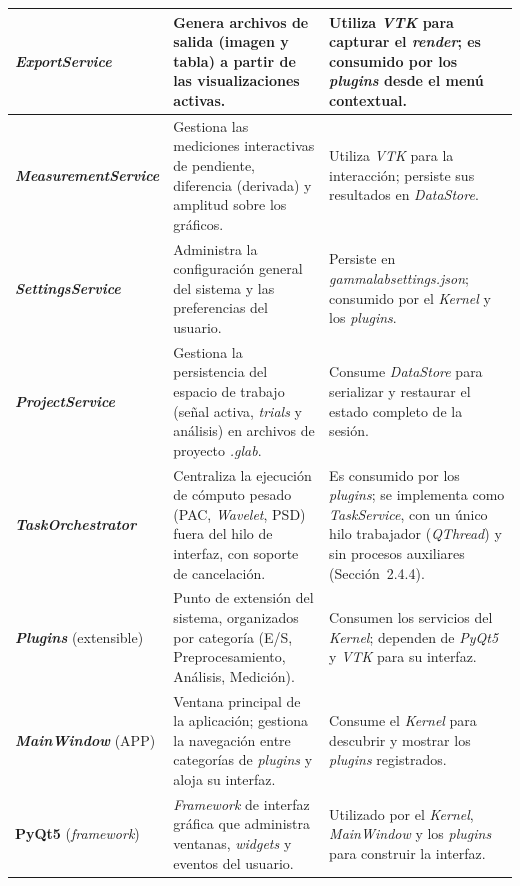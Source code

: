 \documentclass[12pt,letterpaper,oneside]{article}
\DeclareRobustCommand{\_}{\textunderscore\allowbreak}
\begin{document}
\begin{center}
\begin{longtable}{|p{}|p{}|p{}|}
\textbf{\textit{ExportService}} & Genera archivos de salida (imagen y tabla) a partir de las visualizaciones activas. & Utiliza \textit{VTK} para capturar el \textit{render}; es consumido por los \textit{plugins} desde el men\'u contextual. \\
\hline

\textbf{\textit{Measurement\-Service}} & Gestiona las mediciones interactivas de pendiente, diferencia (derivada) y amplitud sobre los gr\'aficos. & Utiliza \textit{VTK} para la interacci\'on; persiste sus resultados en \textit{DataStore}. \\
\hline

\textbf{\textit{SettingsService}} & Administra la configuraci\'on general del sistema y las preferencias del usuario. & Persiste en \textit{gamma\_\allowbreak lab\_\allowbreak settings.json}; consumido por el \textit{Kernel} y los \textit{plugins}. \\
\hline

\textbf{\textit{ProjectService}} & Gestiona la persistencia del espacio de trabajo (se\~nal activa, \textit{trials} y an\'alisis) en archivos de proyecto \textit{.glab}. & Consume \textit{DataStore} para serializar y restaurar el estado completo de la sesi\'on. \\
\hline

\textbf{\textit{Task\-Orchestrator}} & Centraliza la ejecuci\'on de c\'omputo pesado (PAC, \textit{Wavelet}, PSD) fuera del hilo de interfaz, con soporte de cancelaci\'on. & Es consumido por los \textit{plugins}; se implementa como \textit{TaskService}, con un único hilo trabajador (\textit{QThread}) y sin procesos auxiliares (Sección~2.4.4). \\
\hline

\textbf{\textit{Plugins}} (extensible) & Punto de extensi\'on del sistema, organizados por categor\'ia (E/S, Preprocesamiento, An\'alisis, Medici\'on). & Consumen los servicios del \textit{Kernel}; dependen de \textit{PyQt5} y \textit{VTK} para su interfaz. \\
\hline

\textbf{\textit{MainWindow}} (APP) & Ventana principal de la aplicaci\'on; gestiona la navegaci\'on entre categor\'ias de \textit{plugins} y aloja su interfaz. & Consume el \textit{Kernel} para descubrir y mostrar los \textit{plugins} registrados. \\
\hline

\textbf{PyQt5} (\textit{framework}) & \textit{Framework} de interfaz gr\'afica que administra ventanas, \textit{widgets} y eventos del usuario. & Utilizado por el \textit{Kernel}, \textit{MainWindow} y los \textit{plugins} para construir la interfaz. \\
\hline


\end{longtable}
\end{center}
\end{document}
